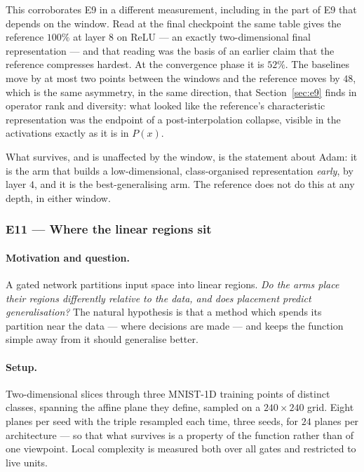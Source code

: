 \documentclass{article} %
\theoremstyle{plain}
\theoremstyle{definition}
\theoremstyle{remark}
\begin{document}
This corroborates E9 in a different measurement, including in the part of E9 that depends on the
window. Read at the final checkpoint the same table gives the reference $100\%$ at layer $8$ on
ReLU --- an exactly two-dimensional final representation --- and that reading was the basis of an
earlier claim that the reference compresses hardest. At the convergence phase it is $52\%$. The
baselines move by at most two points between the windows and the reference moves by $48$, which is
the same asymmetry, in the same direction, that Section~\ref{sec:e9} finds in operator rank and
diversity: what looked like the reference's characteristic representation was the endpoint of a
post-interpolation collapse, visible in the activations exactly as it is in $P(x)$.

What survives, and is unaffected by the window, is the statement about Adam: it is the arm that
builds a low-dimensional, class-organised representation \emph{early}, by layer $4$, and it is the
best-generalising arm. The reference does not do this at any depth, in either window.

\subsubsection{E11 --- Where the linear regions sit}
\label{sec:e11}

\paragraph{Motivation and question.}
A gated network partitions input space into linear regions. \emph{Do the arms place their regions
differently relative to the data, and does placement predict generalisation?} The natural hypothesis
is that a method which spends its partition near the data --- where decisions are made --- and keeps
the function simple away from it should generalise better.

\paragraph{Setup.}
Two-dimensional slices through three MNIST-1D training points of distinct classes, spanning the
affine plane they define, sampled on a $240\times240$ grid. Eight planes per seed with the triple
resampled each time, three seeds, for $24$ planes per architecture --- so that what survives is a
property of the function rather than of one viewpoint. Local complexity is measured both over all
gates and restricted to live units.
\end{document}

